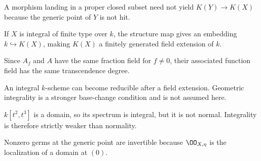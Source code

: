 \begin{example}\label{advex:vi27-09}
A morphism landing in a proper closed subset need not yield $K(Y)\to K(X)$ because the generic point of $Y$ is not hit.
\end{example}

\begin{example}\label{advex:vi27-10}
If $X$ is integral of finite type over $k$, the structure map gives an embedding $k\hookrightarrow K(X)$, making $K(X)$ a finitely generated field extension of $k$.
\end{example}

\begin{example}\label{advex:vi27-11}
Since $A_f$ and $A$ have the same fraction field for $f\ne0$, their associated function field has the same transcendence degree.
\end{example}

\begin{example}\label{advex:vi27-12}
An integral $k$-scheme can become reducible after a field extension.  Geometric integrality is a stronger base-change condition and is not assumed here.
\end{example}

\begin{example}\label{advex:vi27-13}
$k[t^2,t^3]$ is a domain, so its spectrum is integral, but it is not normal.  Integrality is therefore strictly weaker than normality.
\end{example}

\begin{example}\label{advex:vi27-14}
Nonzero germs at the generic point are invertible because $\OO_{X,\eta}$ is the localization of a domain at $(0)$.
\end{example}
